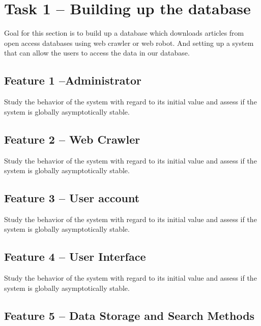 \documentclass[a4paper]{article} %
\begin{document}

\section*{Task 1 -- Building up the database}
\label{task1}

Goal for this section is to build up a database which downloads articles from open access databases using web crawler or web robot. And setting up a system that can allow the users to access the data in our database.

\subsection*{Feature 1 --Administrator}
\label{task1:feature1}

Study the behavior of the system with regard to its initial value and assess if the system is globally asymptotically stable.

\subsection*{Feature 2 -- Web Crawler}
\label{task1:feature2}

Study the behavior of the system with regard to its initial value and assess if the system is globally asymptotically stable.

\subsection*{Feature 3 -- User account}
\label{task1:feature3}

Study the behavior of the system with regard to its initial value and assess if the system is globally asymptotically stable.

\subsection*{Feature 4 -- User Interface}
\label{task1:feature4}

Study the behavior of the system with regard to its initial value and assess if the system is globally asymptotically stable.

\subsection*{Feature 5 -- Data Storage and Search Methods}
\label{task1:feature5}
\end{document}
